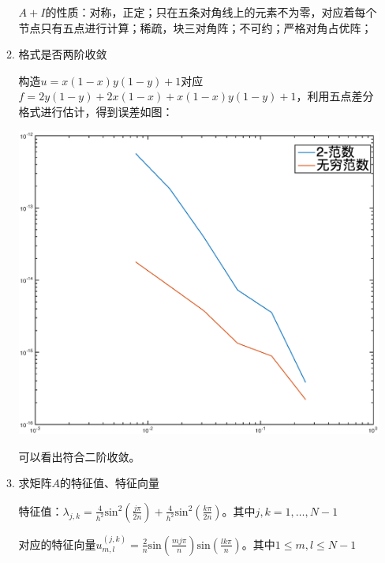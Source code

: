 \documentclass{ctexart}
\begin{document}
\begin{enumerate}
\begin{enumerate}
\(A+I\)的性质：对称，正定；只在五条对角线上的元素不为零，对应着每个节点只有五点进行计算；稀疏，块三对角阵；不可约；严格对角占优阵；

\item 格式是否两阶收敛

构造\(u=x(1-x)y(1-y)+1\)对应\(f=2y(1-y)+2x(1-x)+x(1-x)y(1-y)+1\)，利用五点差分格式进行估计，得到误差如图：

\centerline{\includegraphics[width=5.5in]{H11_1.eps}}

可以看出符合二阶收敛。

\item 求矩阵\(A\)的特征值、特征向量

特征值：\(\lambda_{j,k}=\frac{4}{h^2}\mbox{sin}^2(\frac{j \pi}{2n})+\frac{4}{h^2}\mbox{sin}^2(\frac{k \pi}{2n})\)。其中\(j,k=1,\dots,N-1\)

对应的特征向量\(u_{m,l}^{(j,k)}=\frac{2}{n}\mbox{sin}(\frac{mj \pi}{n})\mbox{sin}(\frac{lk \pi}{n})\)。其中\(1 \leq m,l\leq N-1\)
\end{enumerate}













\end{enumerate}
\end{document}
